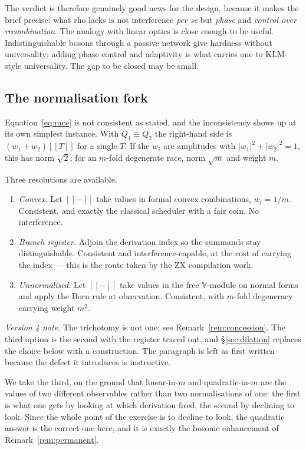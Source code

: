 \documentclass[11pt,a4paper]{article}
\theoremstyle{plain}
\theoremstyle{definition}
\theoremstyle{remark}
\newcommand{\sem}[1]{[\![#1]\!]}
\newcommand{\V}{\mathbb{V}}
\newcommand{\scong}{\equiv}
\begin{document}
The verdict is therefore genuinely good news for the design, because it makes the
brief precise: what rho lacks is not interference \emph{per se} but \emph{phase}
and \emph{control over recombination}. The analogy with linear optics is close
enough to be useful. Indistinguishable bosons through a passive network give
hardness without universality; adding phase control and adaptivity is what
carries one to KLM-style universality. The gap to be closed may be small.

\subsection{The normalisation fork}\label{ssec:fork}

Equation~\eqref{eq:race} is not consistent as stated, and the inconsistency shows
up at its own simplest instance. With $Q_1 \scong Q_2$ the right-hand side is
$(w_1 + w_2)\sem{T}$ for a single $T$. If the $w_i$ are amplitudes with
$|w_1|^2 + |w_2|^2 = 1$, this has norm $\sqrt{2}$; for an $m$-fold degenerate
race, norm $\sqrt{m}$ and weight $m$.

Three resolutions are available.

\begin{enumerate}[leftmargin=1.4em,itemsep=2pt]
\item \emph{Convex.} Let $\sem{-}$ take values in formal convex combinations,
$w_i = 1/m$. Consistent, and exactly the classical scheduler with a fair coin.
No interference.
\item \emph{Branch register.} Adjoin the derivation index so the summands stay
distinguishable. Consistent and interference-capable, at the cost of carrying the
index --- this is the route taken by the ZX compilation work.
\item \emph{Unnormalised.} Let $\sem{-}$ take values in the free $\V$-module on
normal forms and apply the Born rule at observation. Consistent, with $m$-fold
degeneracy carrying weight $m^2$.
\end{enumerate}

\emph{Version 4 note.} The trichotomy is not one; see
Remark~\ref{rem:concession}. The third option is the second with the register
traced out, and \S\ref{sec:dilation} replaces the choice below with a
construction. The paragraph is left as first written because the defect it
introduces is instructive.

We take the third, on the ground that linear-in-$m$ and quadratic-in-$m$ are the
values of two different observables rather than two normalisations of one: the
first is what one gets by looking at which derivation fired, the second by
declining to look. Since the whole point of the exercise is to decline to look,
the quadratic answer is the correct one here, and it is exactly the bosonic
enhancement of Remark~\ref{rem:permanent}.
\end{document}
